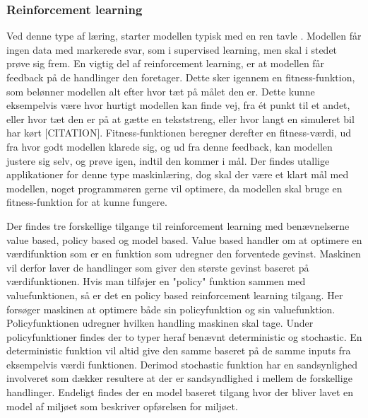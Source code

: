 
\subsubsection{Reinforcement learning}
Ved denne type af læring, starter modellen typisk med en ren tavle \cite{deep-reinforcement-learning}. Modellen får ingen data med markerede svar, som i supervised learning, men skal i stedet prøve sig frem. En vigtig del af reinforcement learning, er at modellen får feedback på de handlinger den foretager. Dette sker igennem en fitness-funktion, som belønner modellen alt efter hvor tæt på målet den er. Dette kunne eksempelvis være hvor hurtigt modellen kan finde vej, fra ét punkt til et andet, eller hvor tæt den er på at gætte en tekststreng, eller hvor langt en simuleret bil har kørt [CITATION]. Fitness-funktionen beregner derefter en fitness-værdi, ud fra hvor godt modellen klarede sig, og ud fra denne feedback, kan modellen justere sig selv, og prøve igen, indtil den kommer i mål. Der findes utallige applikationer for denne type maskinlæring, dog skal der være et klart mål med modellen, noget programmøren gerne vil optimere, da modellen skal bruge en fitness-funktion for at kunne fungere.

Der findes tre forskellige tilgange til reinforcement learning med benævnelserne value based, policy based og model based. Value based handler om at optimere en værdifunktion som er en funktion som udregner den forventede gevinst. Maskinen vil derfor laver de handlinger som giver den største gevinst baseret på værdifunktionen. Hvis man tilføjer en "policy" funktion sammen med valuefunktionen, så er det en policy based reinforcement learning tilgang. Her forsøger maskinen at optimere både sin policyfunktion og sin valuefunktion. Policyfunktionen udregner hvilken handling maskinen skal tage. Under policyfunktioner findes der to typer heraf benævnt deterministic og stochastic. En deterministic funktion vil altid give den samme baseret på de samme inputs fra eksempelvis værdi funktionen. Derimod stochastic funktion har en sandsynlighed involveret som dækker resultere at der er sandsyndlighed i mellem de forskellige handlinger. Endeligt findes der en model baseret tilgang hvor der bliver lavet en model af miljøet som beskriver opførelsen for miljøet. \cite{RLapproaches}

